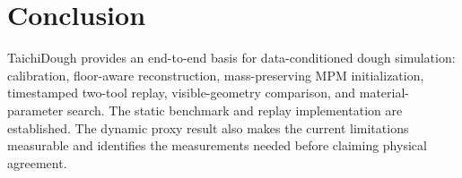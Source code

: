 \documentclass[10pt,a4paper]{article}
\begin{document}
\section{Conclusion}

TaichiDough provides an end-to-end basis for data-conditioned dough simulation: calibration, floor-aware reconstruction, mass-preserving MPM initialization, timestamped two-tool replay, visible-geometry comparison, and material-parameter search. The static benchmark and replay implementation are established. The dynamic proxy result also makes the current limitations measurable and identifies the measurements needed before claiming physical agreement.



\end{document}
